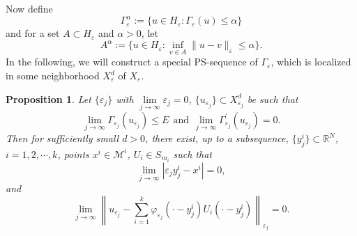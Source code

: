 \documentclass[12pt,reqno]{amsart}
\numberwithin{equation}{section}
\newtheorem{proposition}{Proposition}[section]
\begin{document}
\noindent Now define
$$
{\Gamma}_{\varepsilon}^{\alpha}:=\{u\in H_{\varepsilon}: {\Gamma}_{\varepsilon}(u)\le{\alpha}\}
$$
and for a set $A\subset H_{\varepsilon}$ and ${\alpha}>0$, let
$$
A^{\alpha}:=\{u\in H_{\varepsilon}: \inf_{v\in A}\|u-v\|_{\varepsilon}\le{\alpha}\}.
$$
In the following, we will construct a special PS-sequence of ${\Gamma}_{\varepsilon}$, which is localized in some neighborhood $X_{\varepsilon}^d$ of $X_{\varepsilon}$.

\begin{proposition}\label{prop5}
Let $\{{\varepsilon}_j\}$ with $\lim\limits_{j\rightarrow
\infty}{\varepsilon}_j=0$, $\{u_{{\varepsilon}_j}\}\subset X_{{\varepsilon}_j}^d$
be such that
\begin{equation}\label{4sec27}
\lim\limits_{j\rightarrow
\infty}\Gamma_{{\varepsilon}_j}(u_{{\varepsilon}_j})\leq E \ \ \text{and} \ \
\lim\limits_{j\rightarrow
\infty}\Gamma_{{\varepsilon}_j}^{'}(u_{{\varepsilon}_j})=0.
\end{equation}
Then for sufficiently small $d>0$, there exist, up to a subsequence,
$\{y_j^i\}\subset {\mathbb R}^N$, $i=1,2,\cdots,k$, points $x^i\in \mathcal
{M}^i$, $U_i\in S_{m_i}$ such that
\begin{equation}\label{4sec28}
\lim\limits_{j\rightarrow \infty}\left|{\varepsilon}_jy_j^i-x^i\right|=0,
\end{equation}
and \begin{equation}\label{4sec29} \lim\limits_{j\rightarrow
\infty}\left\|u_{{\varepsilon}_j}-\sum\limits_{i=1}^k\varphi_{{\varepsilon}_j}(\cdot-y_j^i)U_i(\cdot
-y_j^i)\right\|_{{\varepsilon}_j}=0.
\end{equation}
\end{proposition}
\end{document}
